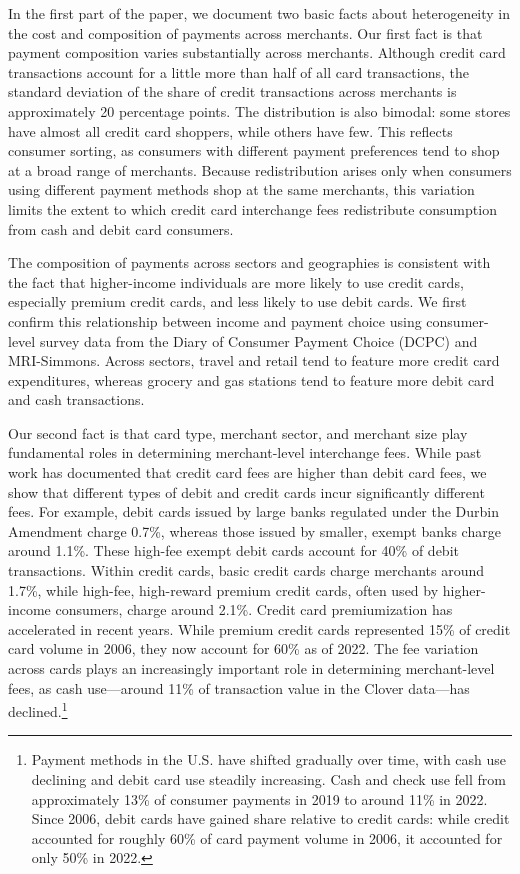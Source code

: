 \documentclass[11pt,english]{article}
\theoremstyle{remark}
\begin{document}
In the first part of the paper, we document two basic facts about heterogeneity in the cost and composition of payments across merchants.
Our first fact is that payment composition varies substantially across merchants.
Although credit card transactions account for a little more than half of all card transactions, the standard deviation of the share of credit transactions across merchants is approximately 20 percentage points.
The distribution is also bimodal: some stores have almost all credit card shoppers, while others have few.
This reflects consumer sorting, as consumers with different payment preferences tend to shop at a broad range of merchants.
Because redistribution arises only when consumers using different payment methods shop at the same merchants, this variation limits the extent to which credit card interchange fees redistribute consumption from cash and debit card consumers.

The composition of payments across sectors and geographies is consistent with the fact that higher-income individuals are more likely to use credit cards, especially premium credit cards, and less likely to use debit cards.
We first confirm this relationship between income and payment choice using consumer-level survey data from the Diary of Consumer Payment Choice (DCPC) and MRI-Simmons.
Across sectors, travel and retail tend to feature more credit card expenditures, whereas grocery and gas stations tend to feature more debit card and cash transactions.




Our second fact is that card type, merchant sector, and merchant size play fundamental roles in determining merchant-level interchange fees.
While past work has documented that credit card fees are higher than debit card fees, we show that different types of debit and credit cards incur significantly different fees.
For example, debit cards issued by large banks regulated under the Durbin Amendment charge 0.7\%, whereas those issued by smaller, exempt banks charge around 1.1\%.
These high-fee exempt debit cards account for 40\% of debit transactions.
Within credit cards, basic credit cards charge merchants around 1.7\%, while high-fee, high-reward premium credit cards, often used by higher-income consumers, charge around 2.1\%.
Credit card premiumization has accelerated in recent years.
While premium credit cards represented 15\% of credit card volume in 2006, they now account for 60\% as of 2022.
The fee variation across cards plays an increasingly important role in determining merchant-level fees, as cash use---around 11\% of transaction value in the Clover data---has declined.\footnote{Payment methods in the U.S. have shifted gradually over time, with cash use declining and debit card use steadily increasing.
Cash and check use fell from approximately 13\% of consumer payments in 2019 to around 11\% in 2022.
Since 2006, debit cards have gained share relative to credit cards: while credit accounted for roughly 60\% of card payment volume in 2006, it accounted for only 50\% in 2022. }
\end{document}
